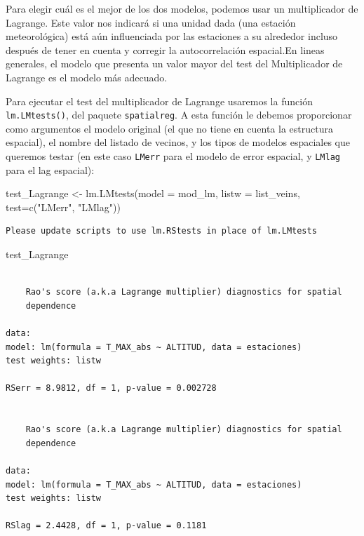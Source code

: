 \documentclass[
  letterpaper,
  DIV=11,
  numbers=noendperiod]{scrreprt}
\newenvironment{Shaded}{\begin{snugshade}}{\end{snugshade}}
\newcommand{\AttributeTok}[1]{\textcolor[rgb]{0.40,0.45,0.13}{#1}}
\newcommand{\FunctionTok}[1]{\textcolor[rgb]{0.28,0.35,0.67}{#1}}
\newcommand{\NormalTok}[1]{\textcolor[rgb]{0.00,0.23,0.31}{#1}}
\newcommand{\OtherTok}[1]{\textcolor[rgb]{0.00,0.23,0.31}{#1}}
\newcommand{\StringTok}[1]{\textcolor[rgb]{0.13,0.47,0.30}{#1}}
\begin{document}
Para elegir cuál es el mejor de los dos modelos, podemos usar un
multiplicador de Lagrange. Este valor nos indicará si una unidad dada
(una estación meteorológica) está aún influenciada por las estaciones a
su alrededor incluso después de tener en cuenta y corregir la
autocorrelación espacial.En lineas generales, el modelo que presenta un
valor mayor del test del Multiplicador de Lagrange es el modelo más
adecuado.

Para ejecutar el test del multiplicador de Lagrange usaremos la función
\texttt{lm.LMtests()}, del paquete \texttt{spatialreg}. A esta función
le debemos proporcionar como argumentos el modelo original (el que no
tiene en cuenta la estructura espacial), el nombre del listado de
vecinos, y los tipos de modelos espaciales que queremos testar (en este
caso \texttt{LMerr} para el modelo de error espacial, y \texttt{LMlag}
para el lag espacial):

\begin{Shaded}
\begin{Highlighting}[]
\NormalTok{test\_Lagrange }\OtherTok{\textless{}{-}} \FunctionTok{lm.LMtests}\NormalTok{(}\AttributeTok{model =}\NormalTok{ mod\_lm,}
                            \AttributeTok{listw =}\NormalTok{ list\_veins, }
                            \AttributeTok{test=}\FunctionTok{c}\NormalTok{(}\StringTok{"LMerr"}\NormalTok{, }\StringTok{"LMlag"}\NormalTok{))}
\end{Highlighting}
\end{Shaded}

\begin{verbatim}
Please update scripts to use lm.RStests in place of lm.LMtests
\end{verbatim}

\begin{Shaded}
\begin{Highlighting}[]
\NormalTok{test\_Lagrange}
\end{Highlighting}
\end{Shaded}

\begin{verbatim}

    Rao's score (a.k.a Lagrange multiplier) diagnostics for spatial
    dependence

data:  
model: lm(formula = T_MAX_abs ~ ALTITUD, data = estaciones)
test weights: listw

RSerr = 8.9812, df = 1, p-value = 0.002728


    Rao's score (a.k.a Lagrange multiplier) diagnostics for spatial
    dependence

data:  
model: lm(formula = T_MAX_abs ~ ALTITUD, data = estaciones)
test weights: listw

RSlag = 2.4428, df = 1, p-value = 0.1181
\end{verbatim}
\end{document}
